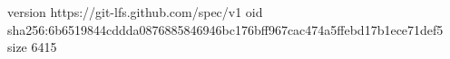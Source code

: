version https://git-lfs.github.com/spec/v1
oid sha256:6b6519844cddda0876885846946bc176bff967cac474a5ffebd17b1ece71def5
size 6415
